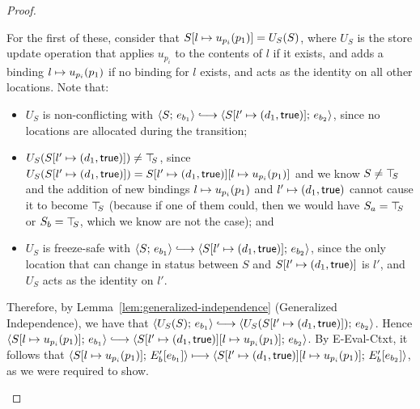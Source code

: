 \begin{proof}
\begin{enumerate}
\begin{enumerate}
\begin{itemize}
          For the first of these, consider that
          $S[l \mapsto u_{p_i}(p_1)] = U_S(S)$, where $U_S$ is the
          store update operation that applies $u_{p_i}$ to the
          contents of $l$ if it exists, and adds a binding
          $l \mapsto u_{p_i}(p_1)$ if no binding for $l$
          exists, and acts as the identity on all other locations.
          Note that:
          \begin{itemize}
          \item $U_S$ is non-conflicting with $\config{S}{e_{b_1}}
            \parstepsto
            \config{\extS{S}{l'}{d_1}{\frozentrue}}{e_{b_2}}$, since
            no locations are allocated during the transition;
          \item $U_S(S[l' \mapsto (d_1, \textsf{true})]) \neq \top\hspace{-0.85mm}_{S}$,
            since $U_S(S[l' \mapsto (d_1, \textsf{true})]) =
            S[l' \mapsto (d_1, \textsf{true})][l \mapsto u_{p_i}(p_1)]$
            and we know $S \neq \top\hspace{-0.85mm}_{S}$ and the addition of new
            bindings $l \mapsto u_{p_i}(p_1)$ and
            $l' \mapsto (d_1, \textsf{true})$ cannot cause it to
            become $\top\hspace{-0.85mm}_{S}$ (because if one of them could, then we
            would have $S_a = \top\hspace{-0.85mm}_{S}$ or $S_b = \top\hspace{-0.85mm}_{S}$, which we know
            are not the case); and
          \item $U_S$ is freeze-safe with $\config{S}{e_{b_1}}
            \parstepsto
            \config{\extS{S}{l'}{d_1}{\frozentrue}}{e_{b_2}}$, since
            the only location that can change in status between $S$
            and $S[l' \mapsto (d_1, \textsf{true})]$ is $l'$, and $U_S$
            acts as the identity on $l'$.
          \end{itemize}
          Therefore, by Lemma~\ref{lem:generalized-independence}
          (Generalized Independence), we have that
          $\config{U_S(S)}{e_{b_1}} \parstepsto
          \config{U_S(\extS{S}{l'}{d_1}{\frozentrue})}{e_{b_2}}$.
          Hence $\config{\extSRaw{S}{l}{u_{p_i}(p_1)}}{e_{b_1}}
          \parstepsto
          \config{\extSRaw{\extS{S}{l'}{d_1}{\frozentrue}}{l}{u_{p_i}(p_1)}}{e_{b_2}}$.
          By {\sc E-Eval-Ctxt}, it follows that
          $\langle S[l \mapsto u_{p_i}(p_1)];\, E'_b\hspace{-0.5mm}\left[e_{b_1}\right] \rangle
          \longmapsto
          \langle S[l' \mapsto (d_1, \textsf{true})][l \mapsto u_{p_i}(p_1)];\, E'_b\hspace{-0.5mm}\left[e_{b_2}\right] \rangle$,
          as we were required to show.


\end{itemize}
\end{enumerate}
\end{enumerate}
\end{proof}
